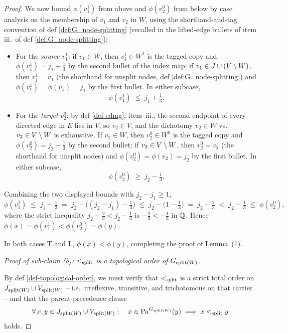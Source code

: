 \documentclass[main]{subfiles}
\begin{document}
\begin{proof}
We now bound $\phi(v_1^1)$ from above and $\phi(v_2^0)$ from below by case analysis on the membership of $v_1$ and $v_2$ in $W$, using the shorthand-and-tag convention of def \ref{def:G_node-splitting} (recalled in the lifted-edge bullets of item iii.\ of def \ref{def:G_node-splitting}):
\begin{itemize}
    \item For the \emph{source} $v_1^1$: if $v_1 \in W$, then $v_1^1 \in W^1$ is the tagged copy and $\phi(v_1^1) = j_1 + \tfrac{1}{3}$ by the second bullet of the index map; if $v_1 \in J \cup (V \setminus W)$, then $v_1^1 = v_1$ (the shorthand for unsplit nodes, def \ref{def:G_node-splitting}) and $\phi(v_1^1) = \phi(v_1) = j_1$ by the first bullet. In either subcase,
        \[
            \phi(v_1^1) \;\le\; j_1 + \tfrac{1}{3}.
        \]
    \item For the \emph{target} $v_2^0$: by def \ref{def-cdmg}, item~iii., the second endpoint of every directed edge in $E$ lies in $V$, so $v_2 \in V$, and the dichotomy $v_2 \in W$ vs.\ $v_2 \in V \setminus W$ is exhaustive. If $v_2 \in W$, then $v_2^0 \in W^0$ is the tagged copy and $\phi(v_2^0) = j_2 - \tfrac{1}{3}$ by the second bullet; if $v_2 \in V \setminus W$, then $v_2^0 = v_2$ (the shorthand for unsplit nodes) and $\phi(v_2^0) = \phi(v_2) = j_2$ by the first bullet. In either subcase,
        \[
            \phi(v_2^0) \;\ge\; j_2 - \tfrac{1}{3}.
        \]
\end{itemize}

Combining the two displayed bounds with $j_2 - j_1 \ge 1$,
\[
    \phi(v_1^1) \;\le\; j_1 + \tfrac{1}{3}
                \;=\; j_2 - \bigl( (j_2 - j_1) - \tfrac{1}{3} \bigr)
                \;\le\; j_2 - \bigl( 1 - \tfrac{1}{3} \bigr)
                \;=\; j_2 - \tfrac{2}{3}
                \;<\; j_2 - \tfrac{1}{3}
                \;\le\; \phi(v_2^0),
\]
where the strict inequality $j_2 - \tfrac{2}{3} < j_2 - \tfrac{1}{3}$ is $-\tfrac{2}{3} < -\tfrac{1}{3}$ in $\mathbb{Q}$. Hence $\phi(x) = \phi(v_1^1) < \phi(v_2^0) = \phi(y)$.

In both cases T and L, $\phi(x) < \phi(y)$, completing the proof of Lemma~(1).

\medskip\noindent\emph{Proof of sub-claim (b): $<_{\mathrm{split}}$ is a topological order of $G_{\mathrm{split}(W)}$.}

By def \ref{def-topological-order}, we must verify that $<_{\mathrm{split}}$ is a strict total order on $J_{\mathrm{split}(W)} \cup V_{\mathrm{split}(W)}$ -- i.e.\ irreflexive, transitive, and trichotomous on that carrier -- and that the parent-precedence clause
\[
    \forall\, x, y \in J_{\mathrm{split}(W)} \cup V_{\mathrm{split}(W)} :\quad x \in \mathrm{Pa}^{G_{\mathrm{split}(W)}}(y) \;\Longrightarrow\; x <_{\mathrm{split}} y
\]
holds.


\end{proof}
\end{document}
